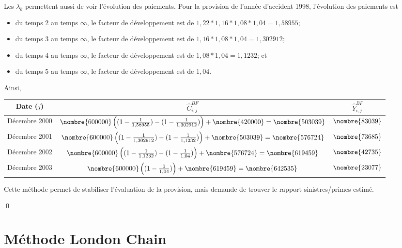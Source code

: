 \begin{exemple}
\begin{enumerate}
    Les $\lambda_k$ permettent aussi de voir l'évolution des
    paiements. Pour la provision de l'année d'accident 1998, l'évolution
    des paiements est
    \begin{itemize}
    \item du temps 2 au temps $\infty$, le facteur de développement
      est de $1,22 * 1,16 * 1,08 * 1,04 = 1,58955$;
    \item du temps 3 au temps $\infty$, le facteur de développement
      est de $1,16 * 1,08 * 1,04 = 1,302912$;
    \item du temps 4 au temps $\infty$, le facteur de développement
      est de $1,08 * 1,04 = 1,1232$; et
    \item du temps 5 au temps $\infty$, le facteur de développement
      est de $1,04$.
    \end{itemize}
    Ainsi,
    \begin{center}
      \begin{tabular}{|c|c|c|}\hline
        Date ($j$) & $\hat{C}_{i,j}^{BF}$ & $\hat{Y}_{i,j}^{BF}$  \\ \hline
        Décembre 2000 &  $\nombre{600000} \left((1-\frac{1}{1,58955}) - (1-\frac{1}{1,302912})\right)   + \nombre{420000} = \nombre{503039}$ & $\nombre{83039}$ \\ \hline
        Décembre 2001 &  $\nombre{600000} \left((1-\frac{1}{1,302912}) - (1-\frac{1}{1,1232})\right) + \nombre{503039} = \nombre{576724}$ & $\nombre{73685}$\\ \hline
        Décembre 2002 &  $\nombre{600000} \left((1-\frac{1}{1,1232}) - (1-\frac{1}{1,04})\right) + \nombre{576724} = \nombre{619459}$ & $\nombre{42735}$\\ \hline
        Décembre 2003 &  $\nombre{600000} \left((1-\frac{1}{1,04}) \right)  + \nombre{619459} = \nombre{642535}$ & $\nombre{23077}$\\ \hline
      \end{tabular}
    \end{center}
    Cette méthode permet de stabiliser l'évaluation de la provision,
    mais demande de trouver le rapport sinistres/primes estimé.
  \end{enumerate}
  \qed
\end{exemple}


\section{Méthode London Chain}


